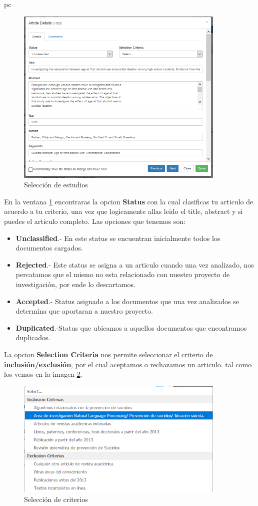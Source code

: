 pc\documentclass[a4paper,12pt,openany]{book}
\begin{document}
\begin{itemize}
\begin{itemize}
    \begin{figure}[H]
    \centering
	\includegraphics[width=10cm]{parsifal20.png}
    \caption{Selección de estudios}
    \label{fig:Parcifal20}
    \end{figure}

 En la ventana \ref{fig:Parcifal20} encontraras la opcion \textbf{Status} con la cual clasificas tu articulo de acuerdo a tu criterio, una vez que logicamente allas leido el title, abstract y si puedes el articulo completo. Las opciones que tenemos son:
 
 \begin{itemize}
\item \textbf{Unclassified}.- En este status se encuentran inicialmente todos los documentos cargados. 
\item \textbf{Rejected}.- Este status se asigna a un articulo cuando una vez analizado, nos percatamos que el mismo no esta relacionado con nuestro proyecto de investigación, por ende lo descartamos.
\item \textbf{Accepted}.- Status asignado a los documentos que una vez analizados se determina que aportaran a nuestro proyecto. 
\item \textbf{Duplicated}.-Status que ubicamos a aquellos documentos que encontramos duplicados.
\end{itemize}

La opcion \textbf{Selection Criteria} nos permite seleccionar el criterio de \textbf{inclusión/exclusión}, por el cual aceptamos o rechazamos un articulo. tal como los vemos en la imagen \ref{fig:Parcifal21}.   

    \begin{figure}[H]
    \centering
	\includegraphics[width=10cm]{parsifal21.png}
    \caption{Selección de criterios}
    \label{fig:Parcifal21}
    \end{figure}


\end{itemize}
\end{itemize}
\end{document}
